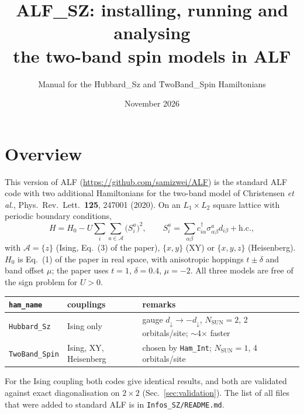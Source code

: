 \documentclass[11pt,a4paper]{article}
\title{ALF\_SZ: installing, running and analysing\\the two-band spin models in ALF}
\author{Manual for the \f{Hubbard\_Sz} and \f{TwoBand\_Spin} Hamiltonians}
\date{November 2026}
\newcommand{\f}[1]{\texttt{#1}}          %
\begin{document}
\maketitle
\tableofcontents

\section{Overview}

This version of ALF (\url{https://github.com/samizwei/ALF}) is the standard ALF code with
two additional Hamiltonians for the two-band model of Christensen \emph{et al.},
Phys.\ Rev.\ Lett.\ \textbf{125}, 247001 (2020). On an $L_1\times L_2$ square lattice with
periodic boundary conditions,
\begin{equation}
  H = H_0 - U\sum_i\sum_{a\in\mathcal A}\bigl(S^a_i\bigr)^2,\qquad
  S^a_i=\sum_{\alpha\beta}c^\dagger_{i\alpha}\sigma^a_{\alpha\beta}d_{i\beta}+\text{h.c.},
\end{equation}
with $\mathcal A=\{z\}$ (Ising, Eq.~(3) of the paper), $\{x,y\}$ (XY) or $\{x,y,z\}$
(Heisenberg). $H_0$ is Eq.~(1) of the paper in real space, with anisotropic hoppings
$t\pm\delta$ and band offset $\mu$; the paper uses $t=1$, $\delta=0.4$, $\mu=-2$.
All three models are free of the sign problem for $U>0$.

\begin{center}
\begin{tabularx}{\textwidth}{llX}
\toprule
\f{ham\_name} & couplings & remarks \\
\midrule
\f{Hubbard\_Sz}   & Ising only & gauge $d_\downarrow\to-d_\downarrow$, $N_\text{SUN}=2$, 2 orbitals/site; $\sim$4$\times$ faster \\
\f{TwoBand\_Spin} & Ising, XY, Heisenberg & chosen by \f{Ham\_Int}; $N_\text{SUN}=1$, 4 orbitals/site \\
\bottomrule
\end{tabularx}
\end{center}

For the Ising coupling both codes give identical results, and both are validated against
exact diagonalisation on $2\times2$ (Sec.~\ref{sec:validation}). The list of all files that
were added to standard ALF is in \f{Infos\_SZ/README.md}.
\end{document}
